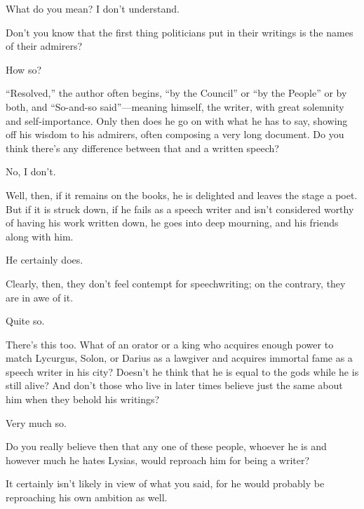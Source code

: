 \sayphaedrus What do you mean? I don’t understand.

\saysocrates Don’t you know that the first thing
politicians put in their
writings is the names
of their admirers?

\sayphaedrus How so?

\saysocrates “Resolved,” the author often begins, “by the Council” or “by
the People” or by both, and “So-and-so
said”---meaning
himself, the writer, with great solemnity and self-importance. Only then
does he go on with what he has to say, showing off his wisdom to his
admirers, often composing a very long document. Do you think there’s any
difference between that and a written speech?

\sayphaedrus No, I don’t.

\saysocrates Well, then, if it remains on the books, he is delighted and
leaves the stage a poet. But if it is struck down, if he fails as a
speech writer and isn’t considered worthy of having his work written
down, he goes into deep mourning, and his friends along with him.

\sayphaedrus He certainly does.

\saysocrates Clearly, then, they don’t feel contempt for speechwriting; on
the contrary, they are in awe of it.

\sayphaedrus Quite so.

\saysocrates There’s this too. What of an orator or a king who acquires 
enough power to match Lycurgus, Solon, or Darius as a
lawgiver and acquires
immortal fame as a speech writer in his city? Doesn’t he think that he
is equal to the gods while he is still alive? And don’t those who live
in later times believe just the same about him when they behold his
writings?

\sayphaedrus Very much so.

\saysocrates Do you really believe then that any one of these people,
whoever he is and however much he hates Lysias, would reproach him for
being a writer?

\sayphaedrus It certainly isn’t likely in view of what you said, for he
would probably be reproaching his own ambition as well.

